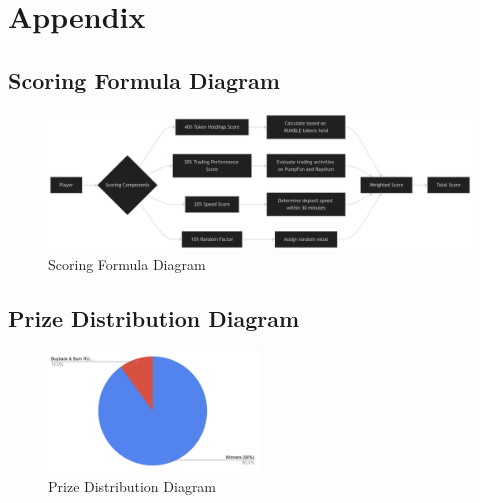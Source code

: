 \documentclass[11pt,a4paper]{article}
\begin{document}
\newpage

\section*{Appendix}

\subsection*{Scoring Formula Diagram}

\begin{figure}[H]
    \centering
    \includegraphics[width=\textwidth]{scoring_formula_diagram.pdf}
    \caption{Scoring Formula Diagram}
    \label{fig:scoring_formula_appendix}
\end{figure}

\subsection*{Prize Distribution Diagram}

\begin{figure}[H]
    \centering
    \includegraphics[width=0.5\textwidth]{prize_distribution_diagram.pdf}
    \caption{Prize Distribution Diagram}
    \label{fig:prize_distribution_appendix}
\end{figure}
\end{document}
